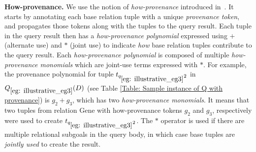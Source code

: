 \textbf{How-provenance.} We use the notion of {\em how-provenance} introduced in~\cite{green2007provenance}. It starts by annotating each base relation tuple with a unique {\em provenance token}, and propagates those tokens along with the tuples to the query result.  Each tuple in the query result then has a {\em how-provenance polynomial} expressed using $+$ (alternate use) and $*$ (joint use) to indicate {\em how} base relation tuples contribute to the query result. Each {\em how-provenance polynomial} is composed of multiple {\em how-provenance monomials} which are joint-use terms expressed with $*$. For example, the provenance polynomial for tuple $t_{q_{\ref{eg: illustrative_eg3}}2}$ in $Q_{\ref{eg: illustrative_eg3}}(D)$ (see Table \ref{Table: Sample instance of Q with provenance}) is $g_2 + g_3$, which has two \textit{how-provenance monomials}. It means that two tuples from relation Gene with how-provenance tokens $g_2$ and $g_3$, respectively
were used to create $t_{q_{\ref{eg: illustrative_eg3}}2}$.  The $*$ operator is used if there are multiple relational subgoals in the query body, in which case base tuples are {\em jointly used} to create the result.



